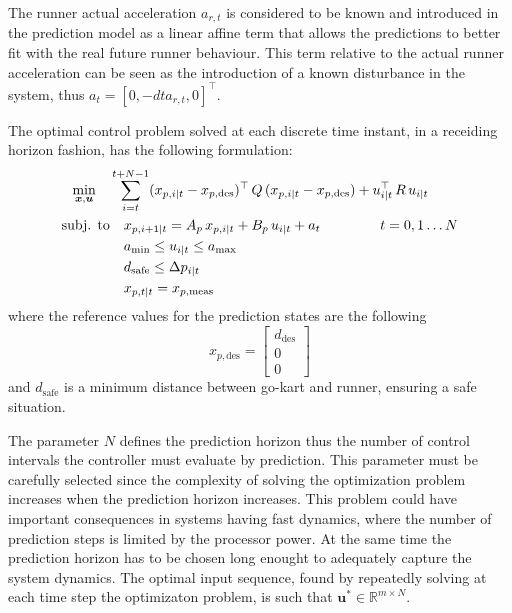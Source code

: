 \documentclass[a4paper,12pt,oneside]{book}
\begin{document}
The runner actual acceleration $a_{r,t}$ is considered to be known and introduced in the prediction model as a linear affine term that allows the predictions to better fit with the real future runner behaviour.
This term relative to the actual runner acceleration can be seen as the introduction of a known disturbance in the system, thus $a_t = [0, -dt a_{r,t}, 0]^\top$.

\bigskip
The optimal control problem solved at each discrete time instant, in a receiding horizon fashion, has the following formulation:
\begin{equation}
\begin{alignedat}{2}
	\min_{\substack{\boldsymbol{x}, \boldsymbol{u}}}\quad &\sum_{i=t}^{t+N-1} (x_{p,i|t} - x_{p,\text{des}}) ^\top \, Q \, (x_{p,i|t} - x_{p,\text{des}}) +  u_{i|t}^\top \, R \, u_{i|t} &&   \\
	\text{subj. to} & \quad x_{p,i+1|t}  = A_p \, x_{p,i|t} + B_p \, u_{i|t} + a_t  \hspace{1.5cm} t = 0, 1 \ldots N && \\
    &\quad a_{\text{min}} \leq u_{i|t} \leq a_{\text{max}}&& \\
    &\quad d_{\text{safe}}\leq \Delta p_{i|t} &&  \\
    &\quad x_{p,t|t} = x_{p,\text{meas}} &&
\end{alignedat}
\label{MPC_formulation}
\end{equation}
where the reference values for the prediction states are the following
\begin{equation}
    x_{p,\text{des}} =
    \begin{bmatrix}
        d_{\text{des}}  \\
        0 \\
        0
    \end{bmatrix}
\end{equation}
and $d_{\text{safe}}$ is a minimum distance between go-kart and runner, ensuring a safe situation.

\bigskip
The parameter $N$ defines the prediction horizon thus the number of control intervals the controller must evaluate by prediction. 
This parameter must be carefully selected since the complexity of solving the optimization problem increases when the prediction horizon increases. 
This problem could have important consequences in systems having fast dynamics, where the number of prediction steps is limited by the processor power.
At the same time the prediction horizon has to be chosen long enought to adequately capture the system dynamics.
The optimal input sequence, found by repeatedly solving at each time step the optimizaton problem, is such that $\boldsymbol{u}^* \in \mathbb{R}^{m \times N}$.
\end{document}
